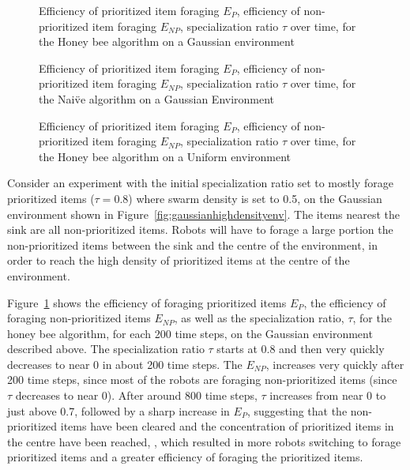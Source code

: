 \begin{figure}[!htb]
\centering
\small
\resizebox{\textwidth}{!}{}
\caption{Efficiency of prioritized item foraging $E_P$, efficiency of non-prioritized item foraging $E_{NP}$, specialization ratio $\tau$ over time, for the Honey bee algorithm on a Gaussian environment}
\label{fig:gaussianhighdensityperformancehoneybee}
\end{figure}

\begin{figure}[!htb]
\centering
\small
\resizebox{\textwidth}{!}{}
\caption{Efficiency of prioritized item foraging $E_P$, efficiency of non-prioritized item foraging $E_{NP}$, specialization ratio $\tau$ over time, for the Nai\"ve algorithm on a Gaussian Environment}
\label{fig:gaussianhighdensityperformancenaive}
\end{figure}

\begin{figure}[!htb]
\centering
\small
\resizebox{\textwidth}{!}{}
\caption{Efficiency of prioritized item foraging $E_P$, efficiency of non-prioritized item foraging $E_{NP}$, specialization ratio $\tau$ over time, for the Honey bee algorithm on a Uniform environment}
\label{fig:uniformhighdensityperformancehoneybee}
\end{figure}


Consider an experiment with the initial specialization ratio set to mostly forage prioritized items ($\tau=0.8$) where swarm density is set to 0.5, on the Gaussian environment shown in Figure~\ref{fig:gaussianhighdensityenv}. The items nearest the sink are all non-prioritized items. Robots will have to forage a large portion the non-prioritized items between the sink and the centre of the environment, in order to reach the high density of prioritized items at the centre of the environment. 

Figure~\ref{fig:gaussianhighdensityperformancehoneybee} shows the efficiency of foraging prioritized items $E_P$, the efficiency of foraging non-prioritized items $E_{NP}$, as well as the specialization ratio, $\tau$, for the honey bee algorithm, for each 200 time steps, on the Gaussian environment described above. The specialization ratio $\tau$ starts at 0.8 and then very quickly decreases to near 0 in about 200 time steps. The $E_{NP}$, increases very quickly after 200 time steps, since most of the robots are foraging non-prioritized items (since $\tau$ decreases to near 0). After around 800 time steps, $\tau$ increases from near 0 to just above 0.7, followed by a sharp increase in $E_P$, suggesting that the non-prioritized items have been cleared and the concentration of prioritized items in the centre have been reached, , which resulted in more robots switching to forage prioritized items and a greater efficiency of foraging the prioritized items.

